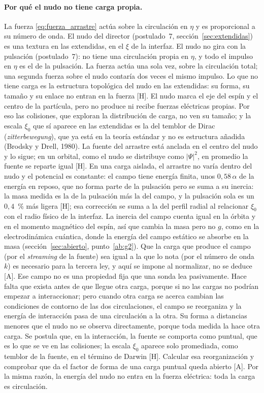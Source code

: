 \documentclass[11pt,a4paper]{article}
\newcommand{\st}[1]{\textup{[#1]}}
\newcommand{\apartado}[1]{\paragraph{#1}}
\begin{document}
\apartado{Por qué el nudo no tiene carga propia.} La fuerza \eqref{eq:fuerza_arrastre} actúa sobre la circulación en $\eta$ y es proporcional a su número de onda. El nudo del director (postulado~7, sección~\ref{sec:extendidas}) es una textura en las extendidas, en el $\xi$ de la interfaz. El nudo no gira con la pulsación (postulado~7): no tiene una circulación propia en $\eta$, y todo el impulso en $\eta$ es el de la pulsación. La fuerza actúa una sola vez, sobre la circulación total; una segunda fuerza sobre el nudo contaría dos veces el mismo impulso. Lo que no tiene carga es la estructura topológica del nudo en las extendidas: su forma, su tamaño y su enlace no entran en la fuerza \st{H}. El nudo marca el eje del espín y el centro de la partícula, pero no produce ni recibe fuerzas eléctricas propias. Por eso las colisiones, que exploran la distribución de carga, no ven su tamaño; y la escala $\xi_0$ que sí aparece en las extendidas es la del temblor de Dirac (\emph{zitterbewegung}), que ya está en la teoría estándar y no es estructura añadida (Brodsky y Drell, 1980). La fuente del arrastre está anclada en el centro del nudo y lo sigue; en un orbital, como el nudo se distribuye como $|\Psi|^2$, en promedio la fuente se reparte igual \st{H}. En una carga aislada, el arrastre no varía dentro del nudo y el potencial es constante: el campo tiene energía finita, unos $0{,}58\,\alpha$ de la energía en reposo, que no forma parte de la pulsación pero se suma a su inercia: la masa medida es la de la pulsación más la del campo, y la pulsación sola es un $0{,}4$~\% más ligera \st{H}; esa corrección se suma a la del perfil radial al relacionar $\xi_0$ con el radio físico de la interfaz. La inercia del campo cuenta igual en la órbita y en el momento magnético del espín, así que cambia la masa pero no $g$, como en la electrodinámica cuántica, donde la energía del campo estático se absorbe en la masa (sección~\ref{sec:abierto}, punto~\ref{ab:g2}). Que la carga que produce el campo (por el \emph{streaming} de la fuente) sea igual a la que lo nota (por el número de onda $k$) es necesario para la tercera ley, y aquí se impone al normalizar, no se deduce \st{A}. Ese campo no es una propiedad fija que una sonda lea pasivamente. Hace falta que exista antes de que llegue otra carga, porque si no las cargas no podrían empezar a interaccionar; pero cuando otra carga se acerca cambian las condiciones de contorno de las dos circulaciones, el campo se reorganiza y la energía de interacción pasa de una circulación a la otra. Su forma a distancias menores que el nudo no se observa directamente, porque toda medida la hace otra carga. Se postula que, en la interacción, la fuente se comporta como puntual, que es lo que se ve en las colisiones; la escala $\xi_0$ aparece solo promediada, como temblor de la fuente, en el término de Darwin \st{H}. Calcular esa reorganización y comprobar que da el factor de forma de una carga puntual queda abierto \st{A}. Por la misma razón, la energía del nudo no entra en la fuerza eléctrica: toda la carga es circulación.
\end{document}
